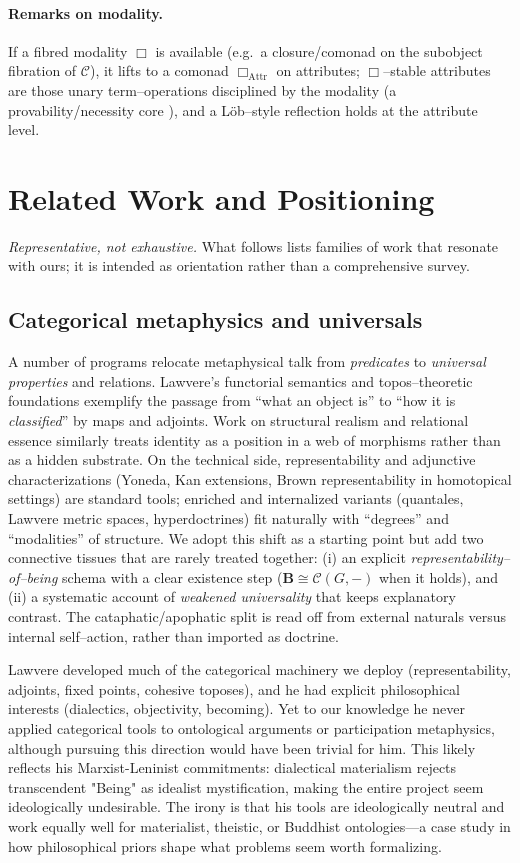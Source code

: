 \documentclass[11pt]{article}
\theoremstyle{upright}
\begin{document}
\paragraph{Remarks on modality.}
If a fibred modality \(\Box\) is available (e.g.\ a closure/comonad on the subobject fibration of \(\mathcal C\)), it lifts to a comonad \(\Box_{\mathrm{Attr}}\) on attributes; \(\Box\)–stable attributes are those unary term–operations disciplined by the modality (a provability/necessity core \citep{Boolos1993}), and a Löb–style reflection holds at the attribute level.

\section{Related Work and Positioning}\label{sec:related}
\noindent\emph{Representative, not exhaustive.} What follows lists families of work that resonate with ours; it is intended as orientation rather than a comprehensive survey.

\subsection{Categorical metaphysics and universals}\label{subsec:rw-universals}
A number of programs relocate metaphysical talk from \emph{predicates} to \emph{universal properties} and relations. Lawvere’s functorial semantics and topos–theoretic foundations exemplify the passage from “what an object is” to “how it is \emph{classified}” by maps and adjoints. Work on structural realism \citep{Ladyman2007, Worrall1989} and relational essence similarly treats identity as a position in a web of morphisms rather than as a hidden substrate. On the technical side, representability and adjunctive characterizations (Yoneda, Kan extensions, Brown representability in homotopical settings) are standard tools; enriched and internalized variants (quantales, Lawvere metric spaces, hyperdoctrines) fit naturally with “degrees” and “modalities” of structure. We adopt this shift as a starting point but add two connective tissues that are rarely treated together: (i) an explicit \emph{representability–of–being} schema with a clear existence step ($\mathbf B\cong\mathcal C(G,-)$ when it holds), and (ii) a systematic account of \emph{weakened universality} that keeps explanatory contrast. The cataphatic/apophatic split is read off from external naturals versus internal self–action, rather than imported as doctrine.

Lawvere developed much of the categorical machinery we deploy (representability, adjoints, fixed points, cohesive toposes), and he had explicit philosophical interests (dialectics, objectivity, becoming). Yet to our knowledge he never applied categorical tools to ontological arguments or participation metaphysics, although pursuing this direction would have been  trivial for him. This likely reflects his Marxist-Leninist commitments: dialectical materialism rejects transcendent "Being" as idealist mystification, making the entire project seem ideologically undesirable. The irony is that his tools are ideologically neutral and work equally well for materialist, theistic, or Buddhist ontologies—a case study in how philosophical priors shape what problems seem worth formalizing.
\end{document}
